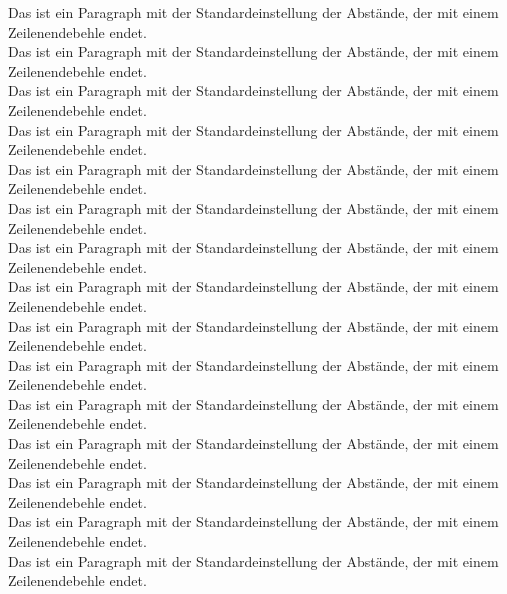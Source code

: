 \documentclass[a5paper]{article}
\begin{document}
Das ist ein Paragraph mit der Standardeinstellung der Abstände, der mit einem Zeilenendebehle endet.\\

Das ist ein Paragraph mit der Standardeinstellung der Abstände, der mit einem Zeilenendebehle endet.\\

Das ist ein Paragraph mit der Standardeinstellung der Abstände, der mit einem Zeilenendebehle endet.\\

Das ist ein Paragraph mit der Standardeinstellung der Abstände, der mit einem Zeilenendebehle endet.\\

Das ist ein Paragraph mit der Standardeinstellung der Abstände, der mit einem Zeilenendebehle endet.\\

Das ist ein Paragraph mit der Standardeinstellung der Abstände, der mit einem Zeilenendebehle endet.\\

Das ist ein Paragraph mit der Standardeinstellung der Abstände, der mit einem Zeilenendebehle endet.\\

Das ist ein Paragraph mit der Standardeinstellung der Abstände, der mit einem Zeilenendebehle endet.\\

Das ist ein Paragraph mit der Standardeinstellung der Abstände, der mit einem Zeilenendebehle endet.\\

Das ist ein Paragraph mit der Standardeinstellung der Abstände, der mit einem Zeilenendebehle endet.\\

Das ist ein Paragraph mit der Standardeinstellung der Abstände, der mit einem Zeilenendebehle endet.\\

Das ist ein Paragraph mit der Standardeinstellung der Abstände, der mit einem Zeilenendebehle endet.\\

Das ist ein Paragraph mit der Standardeinstellung der Abstände, der mit einem Zeilenendebehle endet.\\

Das ist ein Paragraph mit der Standardeinstellung der Abstände, der mit einem Zeilenendebehle endet.\\

Das ist ein Paragraph mit der Standardeinstellung der Abstände, der mit einem Zeilenendebehle endet.\\
\end{document}
